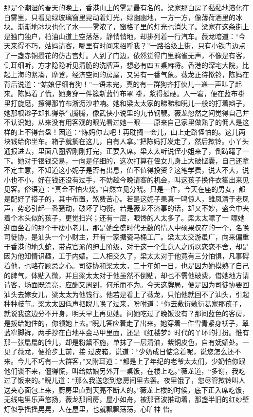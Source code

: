 \documentclass{article}
\begin{document}
那是个潮湿的春天的晚上，香港山上的雾是最有名的。梁家那白房子黏黏地溶化在白雾里，只看见绿玻璃窗里晃动着灯光，绿幽幽地，一方一方，像薄荷酒里的冰块。渐渐地冰块也化了水——雾浓了，窗格子里的灯光也消失了。梁家在这条街上是独门独户，柏油山道上空落落，静悄悄地，却排列着一行汽车。薇龙暗道：“今天来得不巧，姑妈请客，哪里有时间来招呼我？”一路拾级上街，只有小铁门边点了一盏赤铜攒花的仿古宫灯。人到了门边，依然觉得门里鸦雀无声，不像是有客，侧耳细听，方才隐隐听见清脆的洗牌声，想必有四五桌麻将。香港的深宅大院，比起上海的紧凑，摩登，经济空间的房屋，又另有一番气象。薇龙正待揿铃，陈妈在背后说道：“姑娘仔细有狗！”一语未完，真的有一群狗齐打伙儿一递一声叫了起来。陈妈着了慌，她身穿一件簇新蓝竹布罩
\newpage
褂，浆得挺硬。人一窘，便在蓝布褂里打旋磨，擦得那竹布淅沥沙啦响。她和梁太太家的睇睇和睨儿一般的打着辫子，她那根辫子却扎得杀气腾腾，像武侠小说里的九节钢鞭。薇龙忽然之间觉得自己并不认识她，从来没有用客观的眼光看过她一眼——原来自己家里做熟了的佣人是这样的上不得台盘！因道：“陈妈你去吧！再耽搁一会儿，山上走路怪怕的。这儿两块钱给你坐车。箱子就搁在这儿，自有人拿。”把陈妈打发走了，然后揿铃。小丫头通报进去，里面八圈牌刚刚打完，正要入席。梁太太听说侄小姐来了，倒踌躇了一下。她对于银钱交易，一向是仔细的，这次打算在侄女儿身上大破悭囊，自己还拿不定主意，不知道这小妮子是否有出息，值不值得投资？这笔学费，说大不大，说小也不小，好在钱还没有过手，不妨趁今晚请客的机会，叫这孩子换件衣裳出来见见客。俗语道：“真金不怕火烧。”自然立见分晓。只是一件，今天在座的男女，都是配好了搭子的，其中布置，煞费苦心。若是这妮子果真一鸣惊人，雏凤清于老凤声，势必引起一番骚动，破坏了均衡。若是薇龙不济事的话，却又不妙，盛会中夹着个木头似的孩子，更觉扫兴；还有一层，眼馋的人太多了。梁太太瞟了一
\newpage
瞟她迎面坐着的那个干瘦小老儿，那是她全盛时代无数的情人中硕果仅存的一个，名唤司徒协，是汕头一个小财主，开有一家搪瓷马桶工厂。梁太太交游虽广，向来偏重于香港的地头蛇，带点官派的绅士阶级，对于这一个生意人之所以恋恋不舍，却是因为他知情识趣，工于内媚。二人相交久了，梁太太对于他竟有三分怕惧，凡事碍着他，也略存顾忌之心。司徒协和梁太太，二十年如一日，也是因为她摸熟了自己的脾气，体贴入微，并且梁太太对于他虽然不倒贴，却也不需他破费，借她地方请请客，场面既漂亮，应酬又周到，何乐而不为。今天这牌局，便是因为司徒协要回汕头去嫁女儿，梁太太为他饯行。他若是看上了薇龙，只怕他就回不了汕头，引起种种枝节。梁太太因低声把睨儿唤了过来，吩咐道：“你去敷衍敷衍葛家那孩子，就说我这边分不开身，明天早上再见她。问她吃过了晚饭没有？那间蓝色的客房，是拨给她住的，你领她上去。”睨儿答应着走了出来。她穿着一件雪青紧身袄子，翠蓝窄脚裤，两手抄在白地平金马甲里面，还是《红楼梦》时代的丫环的打扮。惟有那一张扁扁的脸儿，却是粉黛不施，单抹了一层清油，紫铜皮色，自有妩媚处。一见了薇龙，便抢步上前，接
\newpage
过皮箱，说道：“少奶成日惦念着呢，说您怎么还不来。今儿不巧有一大群客，”又附耳道：“都是上了年纪的老爷太太们，少奶怕你跟他们谈不来，僵得慌，叫给姑娘另外开一桌饭，在楼上吃。”薇龙道，“多谢，我吃过了饭来的。”睨儿道：“那么我送您到您房间里去罢。夜里饿了，您尽管揿铃叫人送夹心面包上来，厨房里直到天亮不断人的。”薇龙上楼的时候，底下正入席吃饭，无线电里乐声悠扬，薇龙那间房，屋小如舟，被那音波推动着，那盏半旧的红纱壁灯似乎摇摇晃晃，人在屋里，也就飘飘荡荡，心旷神
怡。 
\end{document}
